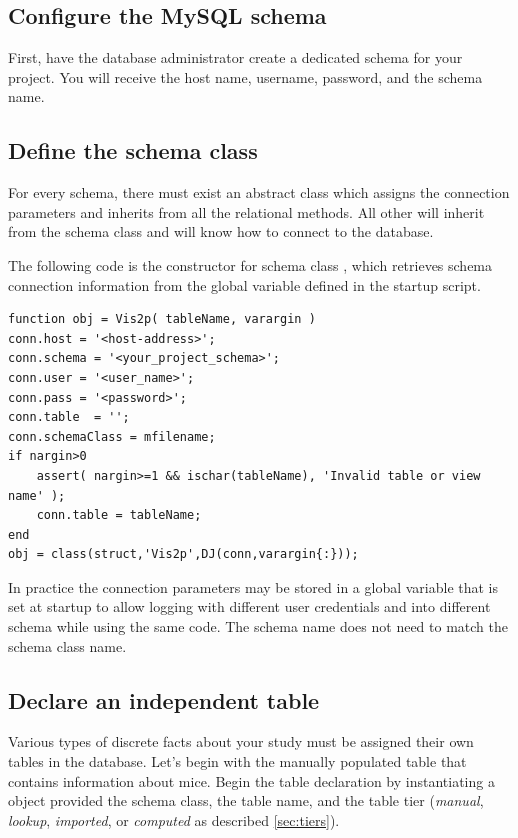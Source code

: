 \documentclass[10pt]{article}
\begin{document}
\subsection{Configure the MySQL schema}
First, have the database administrator create a dedicated schema for your project.  You will receive the host name, username, password, and the schema name.

\subsection{Define the schema class}

For every schema, there must exist an abstract class which assigns the connection parameters and inherits from  all the relational methods.  All other will inherit from the schema class and will know how to connect to the database.  

The following code is the constructor for schema class , which retrieves schema connection information from the global variable defined in the startup script. 

\begin{lstlisting}
function obj = Vis2p( tableName, varargin )
conn.host = '<host-address>';
conn.schema = '<your_project_schema>';
conn.user = '<user_name>';
conn.pass = '<password>';
conn.table  = '';
conn.schemaClass = mfilename;
if nargin>0
    assert( nargin>=1 && ischar(tableName), 'Invalid table or view name' );
    conn.table = tableName;
end
obj = class(struct,'Vis2p',DJ(conn,varargin{:})); 
\end{lstlisting}

In practice the connection parameters may be stored in a global variable that is set at startup to allow logging with different user credentials and into different schema while using the same code.  The schema name does not need to match the schema class name.

\subsection{Declare an independent table} 
Various types of discrete facts about your study must be assigned their own tables in the database. Let's begin with the manually populated table  that contains information about mice.  Begin the table declaration by instantiating a  object provided the schema class, the table name, and the table tier ({\em manual}, {\em lookup}, {\em imported}, or {\em computed} as described \autoref{sec:tiers}).
\end{document}
